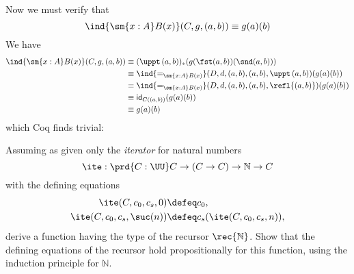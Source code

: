 \nwenddocs{}\endmoddef
{}              
    

                   
                       
            

\nwendcode{}Now we must verify that
\[
  \ind{\sm{x:A}B(x)}(C, g, (a, b)) \equiv g(a)(b)
\]
We have
\begin{align*}
  \ind{\sm{x:A}B(x)}(C, g, (a, b))
  &\equiv
  (\uppt\, (a, b))_{*}(g(\fst(a, b))(\snd(a, b)))
  \\&\equiv
  \ind{=_{\sm{x:A}B(x)}}(D, d, (a, b), (a, b), \uppt\, (a, b))
  (g(a)(b))
  \\&\equiv
  \ind{=_{\sm{x:A}B(x)}}(D, d, (a, b), (a, b), \refl{(a, b)})
  (g(a)(b))
  \\&\equiv
  \mathsf{id}_{C((a, b))}
  (g(a)(b))
  \\&\equiv
  g(a)(b)
\end{align*}
which Coq finds trivial:

\nwenddocs{}\plusendmoddef
{}                

\nwendcode{}  Assuming as given only the \emph{iterator} for natural numbers
\[
  \ite : 
  \prd{C:\UU} C \to (C \to C) \to \mathbb{N} \to C
\]                                                        
with the defining equations
\begin{align*}
  \ite(C, c_{0}, c_{s}, 0) &\defeq c_{0}, \\
  \ite(C, c_{0}, c_{s}, \suc(n)) &\defeq c_{s}(\ite(C, c_{0}, c_{s}, n)),
\end{align*}
derive a function having the type of the recursor $\rec{\mathbb{N}}$.  Show
that the defining equations of the recursor hold propositionally for this
function, using the induction principle for $\mathbb{N}$.

